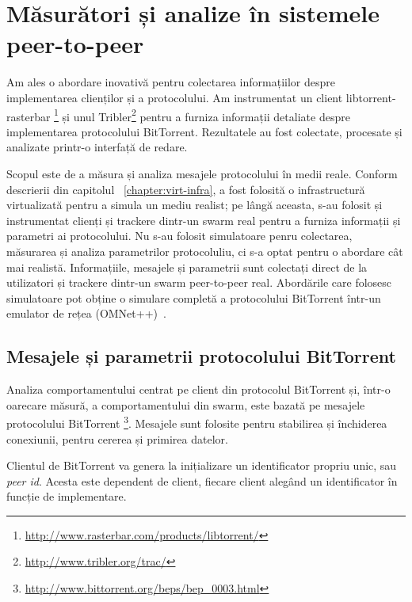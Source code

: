 
\chapter{Măsurători și analize în sistemele peer-to-peer}
\label{chapter:proto-measure}

Am ales o abordare inovativă pentru colectarea informațiilor despre
implementarea clienților și a protocolului. Am instrumentat un client
libtorrent-rasterbar
\footnote{\url{http://www.rasterbar.com/products/libtorrent/}}
și unul Tribler\footnote{\url{http://www.tribler.org/trac/}}
pentru a furniza informații detaliate despre implementarea protocolului
BitTorrent. Rezultatele au fost colectate, procesate și analizate printr-o
interfață de redare.

Scopul este de a măsura și analiza mesajele protocolului în medii reale.
Conform descrierii din capitolul ~\ref{chapter:virt-infra}, a fost folosită o
infrastructură virtualizată pentru a simula un mediu realist; pe lângă aceasta,
s-au folosit și instrumentat clienți și trackere dintr-un swarm real pentru a
furniza informații și parametri ai protocolului. Nu s-au folosit simulatoare
penru colectarea, măsurarea și analiza parametrilor protocoluliu, ci s-a
optat pentru o abordare cât mai realistă. Informațiile, mesajele și parametrii
sunt colectați direct de la utilizatori și trackere dintr-un swarm
peer-to-peer real. Abordările care folosesc simulatoare pot obține o
simulare completă a protocolului BitTorrent într-un emulator de rețea
(OMNet++)~\cite{simulating-bittorrent}.

\section{Mesajele și parametrii protocolului BitTorrent}
\label{sec:proto-measure:protocol-messages}

Analiza comportamentului centrat pe client din protocolul BitTorrent și,
într-o oarecare măsură, a comportamentului din swarm, este bazată pe mesajele
protocolului BitTorrent
\footnote{\url{http://www.bittorrent.org/beps/bep\_0003.html}}.
Mesajele sunt folosite pentru stabilirea și închiderea conexiunii, pentru
cererea și primirea datelor.

Clientul de BitTorrent va genera la inițializare un identificator propriu unic,
sau \textit{peer id}. Acesta este dependent de client, fiecare client alegând
un identificator în funcție de implementare.

